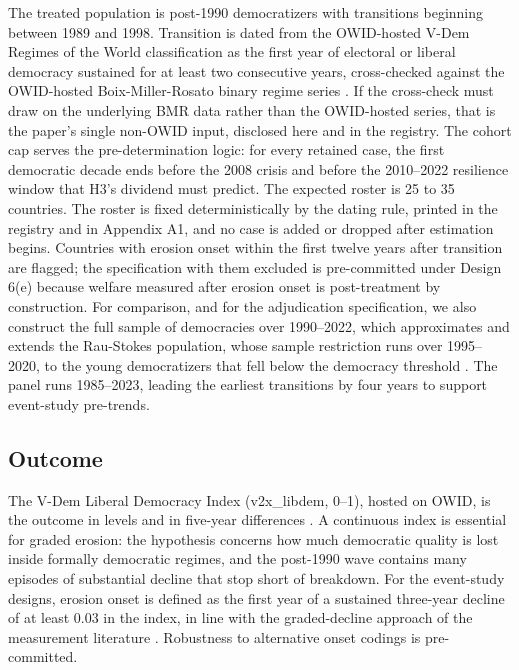 \documentclass[11pt,letterpaper]{article}
\begin{document}
The treated population is post-1990 democratizers with transitions beginning between 1989 and 1998. Transition is dated from the OWID-hosted V-Dem Regimes of the World classification as the first year of electoral or liberal democracy sustained for at least two consecutive years, cross-checked against the OWID-hosted Boix-Miller-Rosato binary regime series \citep{BoixMiller2013, LuhrmannTannenberg2018}. If the cross-check must draw on the underlying BMR data rather than the OWID-hosted series, that is the paper's single non-OWID input, disclosed here and in the registry. The cohort cap serves the pre-determination logic: for every retained case, the first democratic decade ends before the 2008 crisis and before the 2010--2022 resilience window that H3's dividend must predict. The expected roster is 25 to 35 countries. The roster is fixed deterministically by the dating rule, printed in the registry and in Appendix A1, and no case is added or dropped after estimation begins. Countries with erosion onset within the first twelve years after transition are flagged; the specification with them excluded is pre-committed under Design 6(e) because welfare measured after erosion onset is post-treatment by construction. For comparison, and for the adjudication specification, we also construct the full sample of democracies over 1990--2022, which approximates and extends the Rau-Stokes population, whose sample restriction runs over 1995--2020, to the young democratizers that fell below the democracy threshold \citep{RauStokes2025}. The panel runs 1985--2023, leading the earliest transitions by four years to support event-study pre-trends.

\subsection{Outcome}

The V-Dem Liberal Democracy Index (v2x\_libdem, 0--1), hosted on OWID, is the outcome in levels and in five-year differences \citep{OurWorldInData2025, Coppedge2024}. A continuous index is essential for graded erosion: the hypothesis concerns how much democratic quality is lost inside formally democratic regimes, and the post-1990 wave contains many episodes of substantial decline that stop short of breakdown. For the event-study designs, erosion onset is defined as the first year of a sustained three-year decline of at least 0.03 in the index, in line with the graded-decline approach of the measurement literature \citep{WaldnerLust2018}. Robustness to alternative onset codings is pre-committed.
\end{document}
